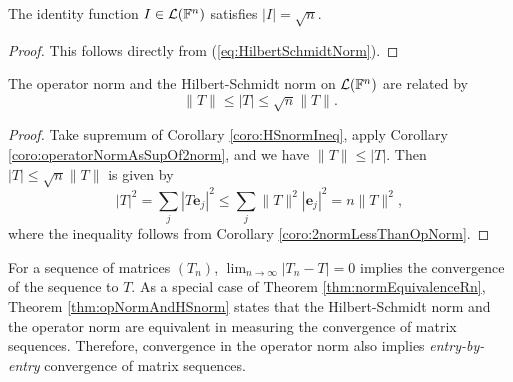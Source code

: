 \begin{coro}
  The identity function $I\in {\cal L}(\mathbb{F}^n)$
  satisfies $|I|=\sqrt{n}$.
\end{coro}
\begin{proof}
  This follows directly from (\ref{eq:HilbertSchmidtNorm}).
\end{proof}

\begin{thm}
  \label{thm:opNormAndHSnorm}
  The operator norm and the Hilbert-Schmidt norm
  on ${\cal L}(\mathbb{F}^n)$
  are related by
  \begin{equation}
    \label{eq:opNormAndHSnorm}
    \|T\| \le |T| \le \sqrt{n} \|T\|.
  \end{equation}
\end{thm}
\begin{proof}
  Take supremum of Corollary \ref{coro:HSnormIneq},
  apply Corollary \ref{coro:operatorNormAsSupOf2norm},
  and we have $\|T\| \le |T|$.
  Then $|T| \le \sqrt{n} \|T\|$ is given by
  \begin{displaymath}
    |T|^2 = \sum_j |T \mathbf{e}_j|^2
    \le \sum_j \|T\|^2 |\mathbf{e}_j|^2 = n \|T\|^2,
  \end{displaymath}
  where the inequality follows from
  Corollary \ref{coro:2normLessThanOpNorm}.
\end{proof}

\begin{rem}
  For a sequence of matrices $(T_n)$,
  $\lim_{n\rightarrow \infty}|T_n-T|=0$
  implies the convergence of the sequence to $T$.
  As a special case of Theorem \ref{thm:normEquivalenceRn}, 
  Theorem \ref{thm:opNormAndHSnorm} states that 
  the Hilbert-Schmidt norm and the operator norm are equivalent
  in measuring the convergence of matrix sequences.
  Therefore,
  convergence in the operator norm
  also implies \emph{entry-by-entry} convergence
  of matrix sequences.
\end{rem}


